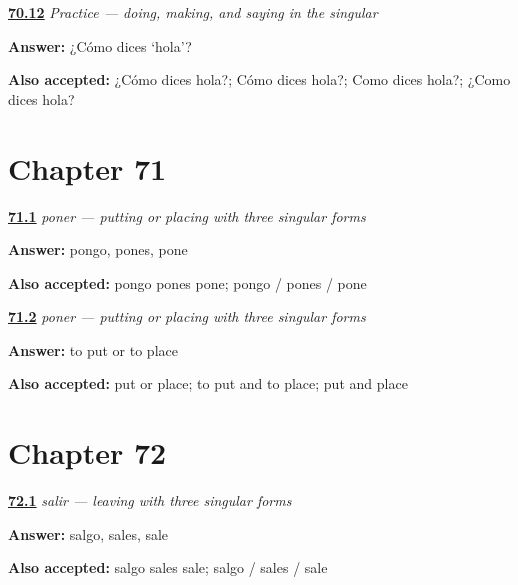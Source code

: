 \noindent\begin{minipage}[t]{\linewidth}
\raggedright
\hyperlink{review-ES-C12-practice-how-say-hello}{\textbf{70.12}} \emph{Practice — doing, making, and saying in the singular}\par
\small \textbf{Answer:} ¿Cómo dices ‘hola’?\par
\footnotesize \textbf{Also accepted:} ¿Cómo dices hola?; Cómo dices hola?; Como dices hola?; ¿Como dices hola?
\end{minipage}\par\medskip

\section*{Chapter 71}

\noindent\begin{minipage}[t]{\linewidth}
\raggedright
\hyperlink{review-ES-C13-poner-singular-forms}{\textbf{71.1}} \emph{poner — putting or placing with three singular forms}\par
\small \textbf{Answer:} pongo, pones, pone\par
\footnotesize \textbf{Also accepted:} pongo pones pone; pongo / pones / pone
\end{minipage}\par\medskip

\noindent\begin{minipage}[t]{\linewidth}
\raggedright
\hyperlink{review-ES-C13-poner-meaning}{\textbf{71.2}} \emph{poner — putting or placing with three singular forms}\par
\small \textbf{Answer:} to put or to place\par
\footnotesize \textbf{Also accepted:} put or place; to put and to place; put and place
\end{minipage}\par\medskip

\section*{Chapter 72}

\noindent\begin{minipage}[t]{\linewidth}
\raggedright
\hyperlink{review-ES-C13-salir-singular-forms}{\textbf{72.1}} \emph{salir — leaving with three singular forms}\par
\small \textbf{Answer:} salgo, sales, sale\par
\footnotesize \textbf{Also accepted:} salgo sales sale; salgo / sales / sale
\end{minipage}\par\medskip

